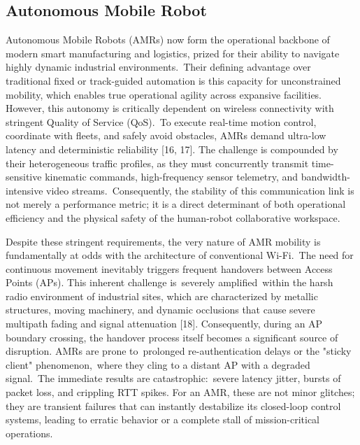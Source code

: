 \documentclass[preprint,11pt]{elsarticle}
\begin{document}
\subsection{Autonomous Mobile Robot}
Autonomous Mobile Robots (AMRs) now form the operational backbone of modern smart manufacturing and logistics, prized for their ability to navigate highly dynamic industrial environments.~Their defining advantage over traditional fixed or track-guided automation is this capacity for unconstrained mobility, which enables true operational agility across expansive facilities. However, this autonomy is critically dependent on wireless connectivity with stringent Quality of Service (QoS).~To execute real-time motion control, coordinate with fleets, and safely avoid obstacles, AMRs demand ultra-low latency and deterministic reliability [16, 17]. The challenge is compounded by their heterogeneous traffic profiles, as they must concurrently transmit time-sensitive kinematic commands, high-frequency sensor telemetry, and bandwidth-intensive video streams.~Consequently, the stability of this communication link is not merely a performance metric; it is a direct determinant of both operational efficiency and the physical safety of the human-robot collaborative workspace.

Despite these stringent requirements, the very nature of AMR mobility is fundamentally at odds with the architecture of conventional Wi-Fi.~The need for continuous movement inevitably triggers frequent handovers between Access Points (APs). This inherent challenge is~severely amplified~within the harsh radio environment of industrial sites, which are characterized by metallic structures, moving machinery, and dynamic occlusions that cause severe multipath fading and signal attenuation [18]. Consequently, during an AP boundary crossing, the handover process itself becomes a significant source of disruption. AMRs are prone to~prolonged re-authentication delays or the "sticky client" phenomenon,~where they cling to a distant AP with a degraded signal.~The immediate results are catastrophic:~severe latency jitter, bursts of packet loss, and crippling RTT spikes. For an AMR, these are not minor glitches; they are transient failures that can instantly destabilize its closed-loop control systems, leading to erratic behavior or a complete stall of mission-critical operations.
\end{document}

